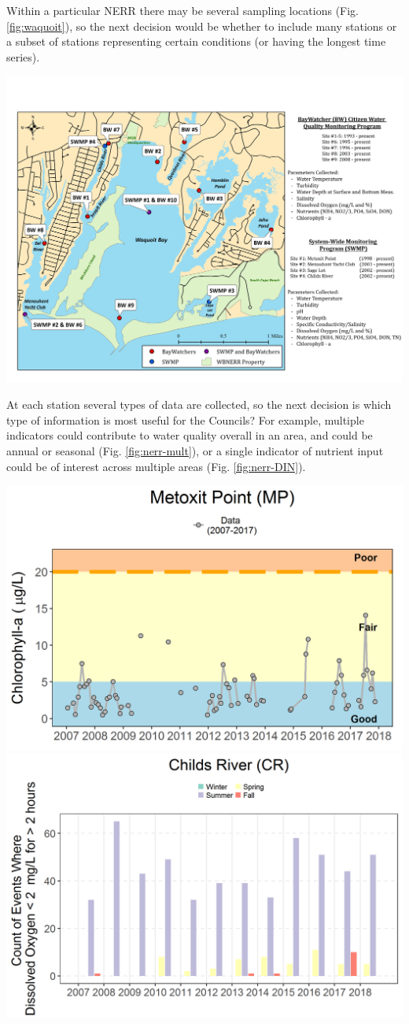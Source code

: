 \documentclass[
  10pt,
]{article}
\let\origfigure\figure
\let\endorigfigure\endfigure
\renewenvironment{figure}[1][2] {
    \expandafter\origfigure\expandafter[H]
} {
    \endorigfigure
}
\begin{document}
Within a particular NERR there may be several sampling locations (Fig.
\ref{fig:waquoit}), so the next decision would be whether to include
many stations or a subset of stations representing certain conditions
(or having the longest time series).

\begin{figure}

{\centering \includegraphics[width=0.75\linewidth]{images/Waquoit_Map} 

}

\caption{Waquit Bay National Estuarine Research Reserve map with sampling locations.}\label{fig:waquoit}
\end{figure}

At each station several types of data are collected, so the next
decision is which type of information is most useful for the Councils?
For example, multiple indicators could contribute to water quality
overall in an area, and could be annual or seasonal (Fig.
\ref{fig:nerr-mult}), or a single indicator of nutrient input could be
of interest across multiple areas (Fig. \ref{fig:nerr-DIN}).

\begin{figure}

{\centering \includegraphics[width=0.49\linewidth]{images/NERRs_Chla} \includegraphics[width=0.49\linewidth]{images/NERRs_DO} 

}

\caption{Multiple water quality attributes.}\label{fig:nerr-mult}
\end{figure}
\end{document}
